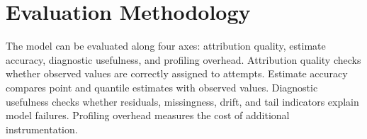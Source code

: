 \section{Evaluation Methodology}
\label{sec:evaluation-methodology}

The model can be evaluated along four axes: attribution quality, estimate
accuracy, diagnostic usefulness, and profiling overhead. Attribution quality
checks whether observed values are correctly assigned to attempts. Estimate
accuracy compares point and quantile estimates with observed values. Diagnostic
usefulness checks whether residuals, missingness, drift, and tail indicators
explain model failures. Profiling overhead measures the cost of additional
instrumentation.
